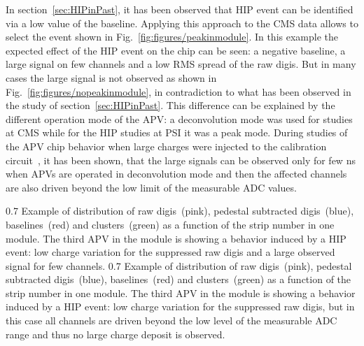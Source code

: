 In section~\ref{sec:HIPinPast}, it has been observed that HIP event can be identified via a low value of the baseline. Applying this approach to the CMS data allows to select the event shown in Fig.~\ref{fig:figures/peakinmodule}. In this example the expected effect of the HIP event on the chip can be seen: a negative baseline, a large signal on few channels and a low RMS spread of the raw digis. But in many cases the large signal is not observed as shown in Fig.~\ref{fig:figures/nopeakinmodule}, in contradiction to what has been observed in the study of section~\ref{sec:HIPinPast}. This difference can be explained by the different operation mode of the APV: a deconvolution mode was used for studies at CMS while for the HIP studies at PSI it was a peak mode. During studies of the APV chip behavior when large charges were injected to the calibration circuit~\cite{Bainbridge:2002bda}, it has been shown, that the large signals can be observed only for few ns when APVs are operated in deconvolution mode and then the affected channels are also driven beyond the low limit of the measurable ADC values. 

                 {0.7}       %
                 {Example of distribution of raw digis~(pink), pedestal subtracted digis~(blue), baselines~(red) and clusters~(green) as a function of the strip number in one module. The third APV in the module is showing a behavior induced by a HIP event: low charge variation for the suppressed raw digis and a large observed signal for few channels. } %
                 {0.7}       %
                 {Example of distribution of raw digis~(pink), pedestal subtracted digis~(blue), baselines~(red) and clusters~(green) as a function of the strip number in one module. The third APV in the module is showing a behavior induced by a HIP event: low charge variation for the suppressed raw digis, but in this case all channels are driven beyond the low level of the measurable ADC range and thus no large charge deposit is observed. } %

